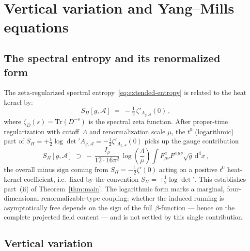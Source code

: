 \documentclass[12pt,a4paper]{article}
\theoremstyle{remark}
\theoremstyle{plain}
\theoremstyle{definition}
\begin{document}
  \section{Vertical variation and Yang--Mills equations}
    \label{sec:variation}

    \subsection{The spectral entropy and its renormalized form}
      \label{subsec:renormalized}

      The zeta-regularized spectral entropy~\eqref{eq:extended-entropy}
      is related to the heat kernel by:
      \begin{equation}\label{eq:zeta-entropy}
        S_\Pi[g, \mathcal{A}]
        \;=\;
        -\tfrac{1}{2}\,\zeta'_{A_{g,\mathcal{A}}}(0)\,,
      \end{equation}
      where $\zeta_D(s) = \mathrm{Tr}(D^{-s})$ is the spectral
      zeta function.
      After proper-time regularization with cutoff~$\Lambda$ and
      renormalization scale $\mu$, the $t^0$ (logarithmic) part of
      $S_\Pi = +\tfrac{1}{2}\log\det' A_{g,\mathcal{A}}
      = -\tfrac{1}{2}\zeta'_{A_{g,\mathcal{A}}}(0)$ picks up the
      gauge contribution
      \begin{equation}\label{eq:entropy-YM}
        S_\Pi[g, \mathcal{A}]
        \;\supset\;
        -\,\frac{I_\rho}{12 \cdot 16\pi^2}\,
        \log\!\left(\frac{\Lambda}{\mu}\right)
        \int
        F^a_{\mu\nu}F^{a\,\mu\nu}
        \sqrt{g}\,\mathrm{d}^4 x\,,
      \end{equation}
      the overall minus sign coming from
      $S_\Pi = -\tfrac{1}{2}\zeta'(0)$ acting on a positive $t^0$
      heat-kernel coefficient, i.e.\ fixed by the convention
      $S_\Pi = +\tfrac{1}{2}\log\det'$.
      This establishes part~(ii) of Theorem~\ref{thm:main}.
      The logarithmic form marks a marginal, four-dimensional
      renormalizable-type coupling; whether the induced running is
      asymptotically free depends on the sign of the full
      $\beta$-function --- hence on the complete projected field
      content --- and is not settled by this single contribution.

    \subsection{Vertical variation}
      \label{subsec:vertical-variation}
\end{document}
